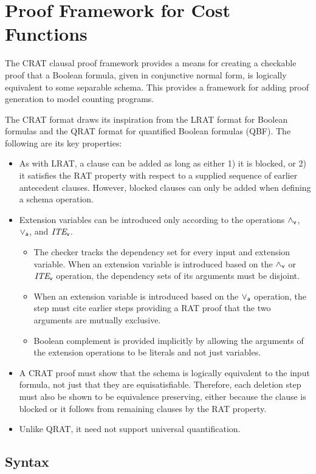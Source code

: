 \documentclass{llncs}
\newcommand{\pand}{\mathbin{\land_{\sf v}}}
\newcommand{\por}{\mathbin{\lor_{\sf a}}}
\newcommand{\pite}{\mbox{\it ITE}_{\sf v}}
\begin{document}
\section{Proof Framework for Cost Functions}

The CRAT clausal proof framework provides a means for creating a
checkable proof that a Boolean formula, given in conjunctive normal
form, is logically equivalent to some separable schema.  This provides
a framework for adding proof generation to model counting programs.

The CRAT format draws its inspiration from the LRAT format for Boolean formulas and the
QRAT format for
quantified Boolean formulas (QBF).  The following are its key properties:
\begin{itemize}
\item As with LRAT, a clause can be added as long as either 1) it is
  blocked, or 2) it satisfies the RAT property with respect to a supplied sequence
  of earlier antecedent clauses.  However, blocked clauses can only be added when defining a schema operation.
\item  Extension variables can be introduced only according to the operations $\pand$, $\por$, and $\pite$.
\begin{itemize}
\item The checker tracks the dependency set for every input and
  extension variable.  When an extension variable is introduced based
  on the $\pand$ or $\pite$ operation, the dependency sets of its arguments must
  be disjoint.
\item When an extension variable is introduced based on the $\por$
  operation, the step must cite earlier steps providing a RAT proof
  that the two arguments are mutually exclusive.
\item Boolean complement is provided implicitly by allowing the
  arguments of the extension operations to be literals and not just
  variables.
\end{itemize}
\item A CRAT proof must show that the schema is logically equivalent
  to the input formula, not just that they are equisatisfiable.
  Therefore, each deletion step must also be shown to be equivalence
  preserving, either because the clause is blocked or it follows from
  remaining clauses by the RAT property.
\item Unlike QRAT, it need not support universal quantification.
\end{itemize}

\subsection{Syntax}
\end{document}
